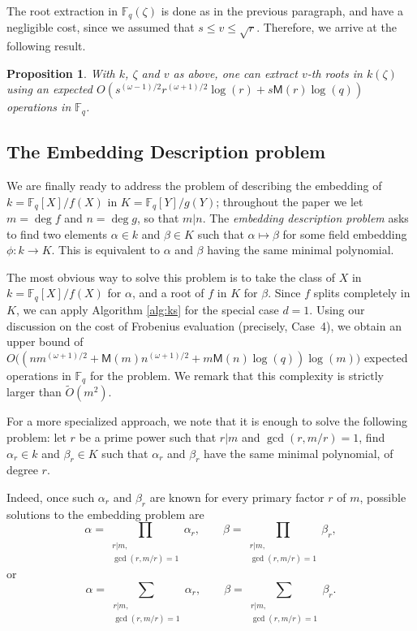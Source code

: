 \documentclass{mcom-l}
\theoremstyle{plain}
\newtheorem{proposition}[theorem]{Proposition}
\theoremstyle{definition}
\newcommand{\tildO}{\tilde{O}}
\newcommand{\F}{\ensuremath{\mathbb{F}}}
\newcommand{\MM}{\ensuremath{\mathsf{M}}}
\begin{document}
The root extraction in $\F_q(\zeta)$ is done as in the previous
paragraph, and have a negligible cost, since we assumed that $s \le v
\le \sqrt{r}$. Therefore, we arrive at the following result.

\begin{proposition}\label{prop:root_high_degree_extension}
With $k$, $\zeta$ and $v$ as above, one can extract $v$-th roots in
$k(\zeta)$ using an expected
$O(s^{(\omega-1)/2}r^{(\omega+1)/2}\log(r) + s\MM(r)\log(q))$
operations in $\F_q$.
\end{proposition}




\subsection{The Embedding Description problem}

We are finally ready to address the problem of describing the embedding of
$k=\F_q[X]/f(X)$ in $K=\F_q[Y]/g(Y)$; throughout the paper we let $m=\deg f$ and
$n=\deg g$, so that $m|n$. The \emph{embedding description problem}
asks to find two elements $\alpha\in k$ and $\beta\in K$ such that
$\alpha\mapsto\beta$ for some field embedding $\phi:k\to K$. This is
equivalent to $\alpha$ and $\beta$ having the same minimal polynomial.

The most obvious way to solve this problem is to take the class of $X$
in $k=\F_q[X]/f(X)$ for $\alpha$, and a root of $f$ in $K$ for
$\beta$. Since $f$ splits completely in $K$, we can apply Algorithm
\ref{alg:ks} for the special case $d = 1$. Using our discussion on the
cost of Frobenius evaluation (precisely, Case~4), we obtain an upper
bound of $O\bigl((nm^{(\omega+1)/2} + \MM(m)n^{(\omega+1)/2} +
m\MM(n)\log(q))\log(m)\bigr)$ expected operations in $\F_q$ for the
problem. We remark that this complexity is strictly larger than
$\tildO(m^2)$.

For a more specialized approach, we note that it is enough to solve
the following problem: let $r$ be a prime power such that $r|m$ and
$\gcd(r,m/r)=1$, find $\alpha_r\in k$ and $\beta_r\in K$ such that
$\alpha_r$ and $\beta_r$ have the same minimal polynomial, of degree $r$.

Indeed, once such $\alpha_r$ and $\beta_r$ are known for every primary
factor $r$ of $m$, possible solutions to the embedding problem are
\begin{equation*}
  \alpha = \prod_{\substack{r|m,\\\gcd(r,m/r)=1}}\alpha_r,\qquad
  \beta = \prod_{\substack{r|m,\\\gcd(r,m/r)=1}}\beta_r,
\end{equation*}
or
\begin{equation*}
  \alpha = \sum_{\substack{r|m,\\\gcd(r,m/r)=1}}\alpha_r,\qquad
  \beta = \sum_{\substack{r|m,\\\gcd(r,m/r)=1}}\beta_r.
\end{equation*}
\end{document}
